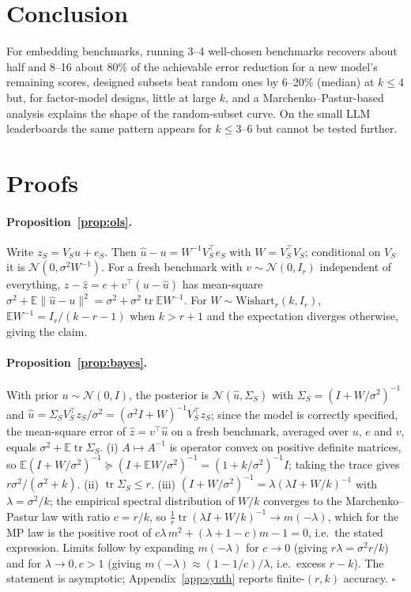 \documentclass{article}
\newcommand{\E}{\mathbb{E}}
\newcommand{\tr}{\operatorname{tr}}
\begin{document}
\section{Conclusion}
For embedding benchmarks, running 3--4 well-chosen benchmarks recovers about half and 8--16 about 80\% of the achievable error reduction for a new model's remaining scores, designed subsets beat random ones by 6--20\% (median) at $k\le4$ but, for factor-model designs, little at large $k$, and a Marchenko--Pastur-based analysis explains the shape of the random-subset curve. On the small LLM leaderboards the same pattern appears for $k\le3$--$6$ but cannot be tested further.




\appendix
\section{Proofs}\label{app:proofs}
\paragraph{Proposition~\ref{prop:ols}.} Write $z_S=V_Su+e_S$. Then $\hat u-u=W^{-1}V_S^\top e_S$ with $W=V_S^\top V_S$; conditional on $V_S$ it is $\mathcal N(0,\sigma^2W^{-1})$. For a fresh benchmark with $v\sim\mathcal N(0,I_r)$ independent of everything, $z-\hat z=e+v^\top(u-\hat u)$ has mean-square $\sigma^2+\E\|\hat u-u\|^2=\sigma^2+\sigma^2\tr\E W^{-1}$. For $W\sim\mathrm{Wishart}_r(k,I_r)$, $\E W^{-1}=I_r/(k-r-1)$ when $k>r+1$ and the expectation diverges otherwise, giving the claim.
\paragraph{Proposition~\ref{prop:bayes}.} With prior $u\sim\mathcal N(0,I)$, the posterior is $\mathcal N(\hat u,\Sigma_S)$ with $\Sigma_S=(I+W/\sigma^2)^{-1}$ and $\hat u=\Sigma_SV_S^\top z_S/\sigma^2=(\sigma^2I+W)^{-1}V_S^\top z_S$; since the model is correctly specified, the mean-square error of $\hat z=v^\top\hat u$ on a fresh benchmark, averaged over $u$, $e$ and $v$, equals $\sigma^2+\E\tr\Sigma_S$. (i) $A\mapsto A^{-1}$ is operator convex on positive definite matrices, so $\E(I+W/\sigma^2)^{-1}\succeq(I+\E W/\sigma^2)^{-1}=(1+k/\sigma^2)^{-1}I$; taking the trace gives $r\sigma^2/(\sigma^2+k)$. (ii) $\tr\Sigma_S\le r$. (iii) $(I+W/\sigma^2)^{-1}=\lambda(\lambda I+W/k)^{-1}$ with $\lambda=\sigma^2/k$; the empirical spectral distribution of $W/k$ converges to the Marchenko--Pastur law with ratio $c=r/k$, so $\frac1r\tr(\lambda I+W/k)^{-1}\to m(-\lambda)$, which for the MP law is the positive root of $c\lambda\,m^2+(\lambda+1-c)m-1=0$, i.e.\ the stated expression. Limits follow by expanding $m(-\lambda)$ for $c\to0$ (giving $r\lambda=\sigma^2r/k$) and for $\lambda\to0,c>1$ (giving $m(-\lambda)\approx(1-1/c)/\lambda$, i.e.\ excess $r-k$). The statement is asymptotic; Appendix~\ref{app:synth} reports finite-$(r,k)$ accuracy. \hfill$\square$
\end{document}
